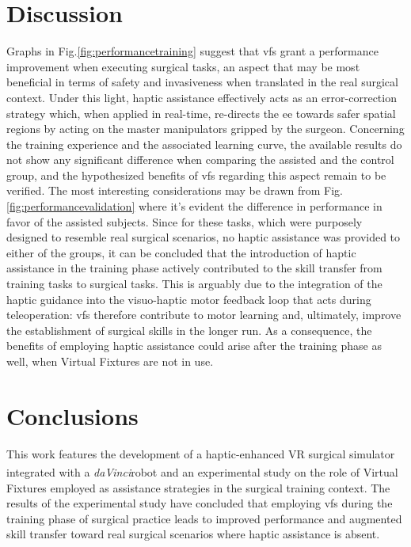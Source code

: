 \documentclass{article}
\newcommand{\cright}{\textsuperscript{\textregistered}\phantom{..}}
\begin{document}
\begin{multicols}{2}
\section{Discussion}
Graphs in Fig.\ref{fig:performancetraining} suggest that \acp{vf} grant a performance improvement when executing surgical tasks, an aspect that may be most beneficial in terms of safety and invasiveness when translated in the real surgical context. Under this light, haptic assistance effectively acts as an error-correction strategy which, when applied in real-time, re-directs the \ac{ee} towards safer spatial regions by acting on the master manipulators gripped by the surgeon.
\newline
Concerning the training experience and the associated learning curve, the available results do not show any significant difference when comparing the assisted and the control group, and the hypothesized benefits of \acp{vf} regarding this aspect remain to be verified.
\newline
The most interesting considerations may be drawn from Fig.\ref{fig:performancevalidation} where it's evident the difference in performance in favor of the assisted subjects. Since for these tasks, which were purposely designed to resemble real surgical scenarios, no haptic assistance was provided to either of the groups, it can be concluded that the introduction of haptic assistance in the training phase actively contributed to the skill transfer from training tasks to surgical tasks. This is arguably due to the integration of the haptic guidance into the visuo-haptic motor feedback loop that acts during teleoperation: \acp{vf} therefore contribute to motor learning and, ultimately, improve the establishment of surgical skills in the longer run. As a consequence, the benefits of employing haptic assistance could arise after the training phase as well, when Virtual Fixtures are not in use.
\section{Conclusions}
This work features the development of a haptic-enhanced VR surgical simulator integrated with a \textit{daVinci}\cright robot and an experimental study on the role of Virtual Fixtures employed as assistance strategies in the surgical training context. The results of the experimental study have concluded that employing \acp{vf} during the training phase of surgical practice leads to improved performance and augmented skill transfer toward real surgical scenarios where haptic assistance is absent.



\end{multicols}
\end{document}
